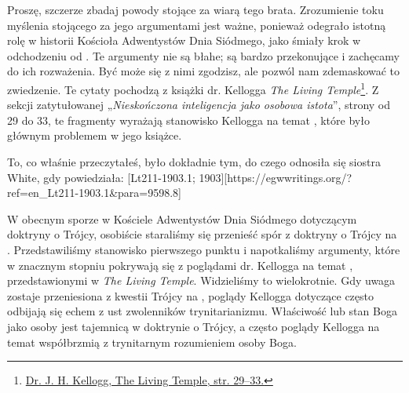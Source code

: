 Proszę, szczerze zbadaj powody stojące za wiarą tego brata. Zrozumienie toku myślenia stojącego za jego argumentami jest ważne, ponieważ odegrało istotną rolę w historii Kościoła Adwentystów Dnia Siódmego, jako śmiały krok w odchodzeniu od . Te argumenty nie są błahe; są bardzo przekonujące i zachęcamy do ich rozważenia. Być może się z nimi zgodzisz, ale pozwól nam zdemaskować to zwiedzenie. Te cytaty pochodzą z książki dr. Kellogga \textit{The Living Temple}\footnote{\href{https://archive.org/details/J.H.Kellogg.TheLivingTemple1903}{Dr. J. H. Kellogg, The Living Temple, str. 29--33.}}. Z sekcji zatytułowanej „\textit{Nieskończona inteligencja jako osobowa istota}”, strony od 29 do 33, te fragmenty wyrażają stanowisko Kellogga na temat , które było głównym problemem w jego książce.

To, co właśnie przeczytałeś, było dokładnie tym, do czego odnosiła się siostra White, gdy powiedziała: [Lt211-1903.1; 1903][https://egwwritings.org/?ref=en\_Lt211-1903.1&para=9598.8]

W obecnym sporze w Kościele Adwentystów Dnia Siódmego dotyczącym doktryny o Trójcy, osobiście staraliśmy się przenieść spór z doktryny o Trójcy na . Przedstawiliśmy stanowisko pierwszego punktu  i napotkaliśmy argumenty, które w znacznym stopniu pokrywają się z poglądami dr. Kellogga na temat , przedstawionymi w \textit{The Living Temple}. Widzieliśmy to wielokrotnie. Gdy uwaga zostaje przeniesiona z kwestii Trójcy na , poglądy Kellogga dotyczące  często odbijają się echem z ust zwolenników trynitarianizmu. Właściwość lub stan Boga jako osoby jest tajemnicą w doktrynie o Trójcy, a często poglądy Kellogga na temat  współbrzmią z trynitarnym rozumieniem osoby Boga.

